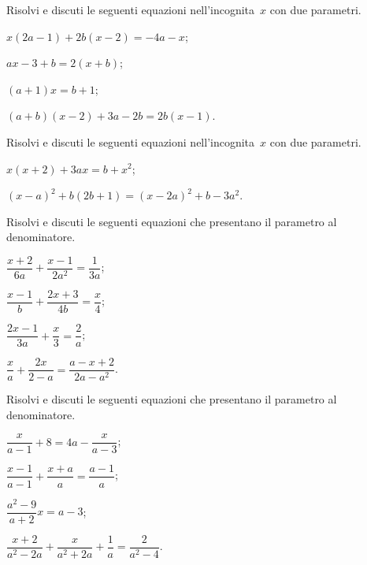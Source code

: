 \begin{esercizio}[\Ast]
\label{ese:17.46}
Risolvi e discuti le seguenti equazioni nell'incognita~$x$ con due parametri.
\begin{multicols}{2}
\begin{enumeratea}
\spazielenx
 \item $x(2a-1)+2b(x-2)=-4a-x$;
 \item $ax-3+b=2(x+b)$;
 \item $(a+1)x=b+1$;
 \item $(a+b)(x-2)+3a-2b=2b(x-1)$.
\end{enumeratea}
\end{multicols}
\end{esercizio}

\begin{esercizio}[\Ast]
\label{ese:17.47}
Risolvi e discuti le seguenti equazioni nell'incognita~$x$ con due parametri.
\begin{enumeratea}
\spazielenx
 \item $x(x+2)+3ax=b+x^{2}$;
 \item $(x-a)^{2}+b(2b+1)=(x-2a)^{2}+b-3a^{2}$.
\end{enumeratea}
\end{esercizio}


\begin{esercizio}[\Ast]
\label{ese:17.48}
Risolvi e discuti le seguenti equazioni che presentano il parametro al denominatore.
\begin{multicols}{2}
\begin{enumeratea}
\spazielenx
 \item $\dfrac{x+2}{6a}+\dfrac{x-1}{2a^{2}}=\dfrac{1}{3a}$;
 \item $\dfrac{x-1}{b}+\dfrac{2x+3}{4b}=\dfrac{x}{4}$;
 \item $\dfrac{2x-1}{3a}+\dfrac{x}{3}=\dfrac{2}{a}$;
 \item $\dfrac{x}{a}+\dfrac{2x}{2-a}=\dfrac{a-x+2}{2a-a^{2}}$.
\end{enumeratea}
\end{multicols}
\end{esercizio}

\begin{esercizio}[\Ast]
\label{ese:17.49}
Risolvi e discuti le seguenti equazioni che presentano il parametro al denominatore.
\begin{multicols}{2}
\begin{enumeratea}
\spazielenx
 \item $\dfrac{x}{a-1}+8=4a-\dfrac{x}{a-3}$;
 \item $\dfrac{x-1}{a-1}+\dfrac{x+a}{a}=\dfrac{a-1}{a}$;
 \item $\dfrac{a^{2}-9}{a+2}x=a-3$;
 \item $\dfrac{x+2}{a^{2}-2a}+\dfrac{x}{a^{2}+2a}+\dfrac{1}{a}=\dfrac{2}{a^{2}-4}$.
\end{enumeratea}
\end{multicols}
\end{esercizio}

